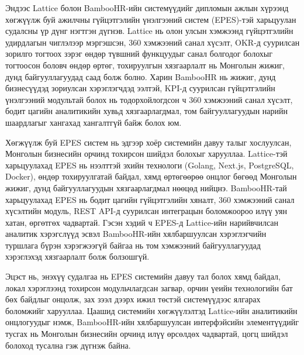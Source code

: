 Эндээс Lattice болон BambooHR-ийн системүүдийг дипломын ажлын хүрээнд хөгжүүлж буй ажилчны гүйцэтгэлийн үнэлгээний систем (EPES)-тэй харьцуулан судалсны үр дүнг нэгтгэн дүгнэв. 
Lattice нь олон улсын хэмжээнд гүйцэтгэлийн удирдлагын чиглэлээр мэргэшсэн, 360 хэмжээний санал хүсэлт, OKR-д суурилсан зорилго тогтоох зэрэг өндөр түвшний функцуудыг санал 
болгодог болохыг тогтоосон боловч өндөр өртөг, тохируулгын хязгаарлалт нь Монголын жижиг, дунд байгууллагуудад саад болж болно. Харин BambooHR нь жижиг, дунд бизнесүүдэд 
зориулсан хэрэглэгчдэд ээлтэй, KPI-д суурилсан гүйцэтгэлийн үнэлгээний модультай болох нь тодорхойлогдсон ч 360 хэмжээний санал хүсэлт, бодит цагийн аналитикийн хувьд 
хязгаарлагдмал, том байгууллагуудын нарийн шаардлагыг хангахад хангалтгүй байж болох юм.

Хөгжүүлж буй EPES систем нь эдгээр хоёр системийн давуу талыг хослуулсан, Монголын бизнесийн орчинд тохирсон шийдэл болохыг харууллаа. Lattice-тэй харьцуулахад 
EPES нь нээлттэй эхийн технологи (Golang, Next.js, PostgreSQL, Docker), өндөр тохируулгатай байдал, хямд өртөгөөрөө онцлог бөгөөд Монголын жижиг, дунд байгууллагуудын 
хязгаарлагдмал нөөцөд нийцнэ. BambooHR-тай харьцуулахад EPES нь бодит цагийн гүйцэтгэлийн хяналт, 360 хэмжээний санал хүсэлтийн модуль, REST API-д суурилсан интеграцын 
боломжоороо илүү уян хатан, өргөтгөх чадвартай. Гэсэн хэдий ч EPES-д Lattice-ийн нарийвчилсан аналитик хэрэгслүүд эсвэл BambooHR-ийн хялбаршуулсан хэрэглэгчийн туршлага 
бүрэн хэрэгжээгүй байгаа нь том хэмжээний байгууллагуудад хэрэглэхэд хязгаарлалт болж болзошгүй.

Эцэст нь, энэхүү судалгаа нь EPES системийн давуу тал болох хямд байдал, локал хэрэглээнд тохирсон модульчлагдсан загвар, орчин үеийн технологийн бат бөх байдлыг онцолж, 
зах зээл дээрх ижил төстэй системүүдээс ялгарах боломжийг харууллаа. Цаашид системийн хөгжүүлэлтэд Lattice-ийн аналитикийн онцлогуудыг нэмж, BambooHR-ийн хялбаршуулсан 
интерфэйсийн элементүүдийг тусгах нь Монголын бизнесийн орчинд илүү өрсөлдөх чадвартай, цогц шийдэл болоход тусална гэж дүгнэж байна.